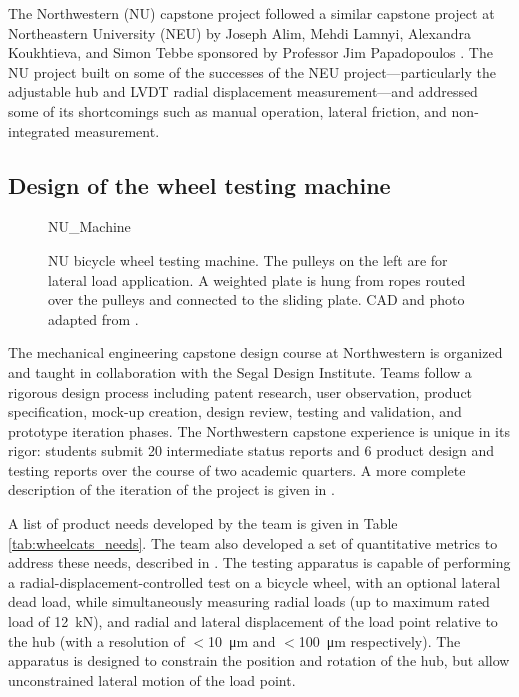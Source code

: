 \documentclass[\rootdir/thesis.tex]{subfiles}
\begin{document}
The Northwestern (NU) capstone project followed a similar capstone project at Northeastern University (NEU) by Joseph Alim, Mehdi Lamnyi, Alexandra Koukhtieva, and Simon Tebbe sponsored by Professor Jim Papadopoulos \cite{Alim2016}. The NU project built on some of the successes of the NEU project---particularly the adjustable hub and LVDT radial displacement measurement---and addressed some of its shortcomings such as manual operation, lateral friction, and non-integrated measurement.

\subsection{Design of the wheel testing machine}

\begin{figure}
\centering
{NU_Machine}
\caption[NU bicycle wheel testing machine]{NU bicycle wheel testing machine. The pulleys on the left are for lateral load application. A weighted plate is hung from ropes routed over the pulleys and connected to the sliding plate. CAD and photo adapted from \cite{WheelCats2018}.}
\label{fig:NU_Machine}
\end{figure}

The mechanical engineering capstone design course at Northwestern is organized and taught in collaboration with the Segal Design Institute. Teams follow a rigorous design process including patent research, user observation, product specification, mock-up creation, design review, testing and validation, and prototype iteration phases. The Northwestern capstone experience is unique in its rigor: students submit 20 intermediate status reports and 6 product design and testing reports over the course of two academic quarters. A more complete description of the iteration of the project is given in \cite{WheelCats2018}.

A list of product needs developed by the team is given in Table \ref{tab:wheelcats_needs}. The team also developed a set of quantitative metrics to address these needs, described in \cite{WheelCats2018}. The testing apparatus is capable of performing a radial-displacement-controlled test on a bicycle wheel, with an optional lateral dead load, while simultaneously measuring radial loads (up to maximum rated load of \SI{12}{\kilo\newton}), and radial and lateral displacement of the load point relative to the hub (with a resolution of $<$\SI{10}{\micro\meter} and $<$\SI{100}{\micro\meter} respectively). The apparatus is designed to constrain the position and rotation of the hub, but allow unconstrained lateral motion of the load point.
\end{document}
